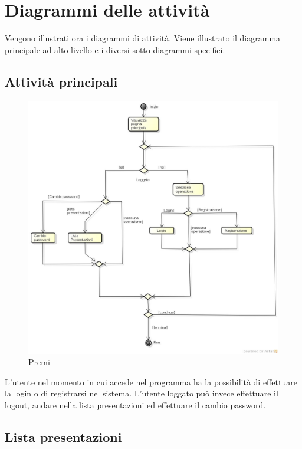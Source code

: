 \section{Diagrammi delle attività}
Vengono illustrati ora i diagrammi di attività. Viene illustrato il diagramma principale ad alto livello e i diversi sotto-diagrammi specifici.

\subsection{Attività principali}

\begin{figure}[h!]
		\centering
		\includegraphics[scale=.2]{img/premi.jpg}
		\caption{Premi}
		\label{fig:ModelloSpy}
\end{figure}

L'utente nel momento in cui accede nel programma ha la possibilità di effettuare la login o di registrarsi nel sistema. 
L'utente loggato può invece effettuare il logout, andare nella lista presentazioni ed effettuare il cambio password. 

\subsection{Lista presentazioni}

